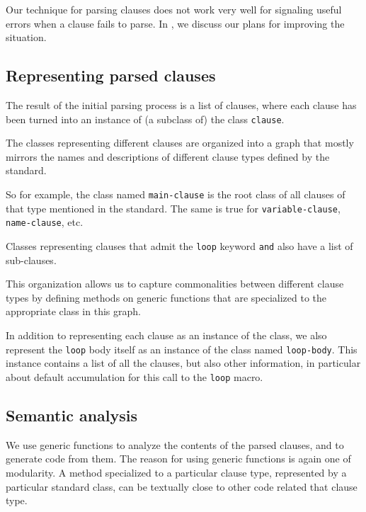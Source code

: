 Our technique for parsing clauses does not work very well for
signaling useful errors when a clause fails to parse.  In
, we discuss our plans for improving
the situation.

\subsection{Representing parsed clauses}
\label{sec-our-technique-representing-parsed-clauses}

The result of the initial parsing process is a list of clauses, where
each clause has been turned into an instance of (a subclass of) the
class \texttt{clause}.

The classes representing different clauses are organized into a graph
that mostly mirrors the names and descriptions of different
clause types defined by the \commonlisp{} standard.

So for example, the class named \texttt{main-clause} is
the root class of all clauses of that type mentioned in the standard.
The same is true for \texttt{variable-clause}, \texttt{name-clause},
etc. 

Classes representing clauses that admit the \texttt{loop} keyword
\texttt{and} also have a list of sub-clauses.

This organization allows us to capture commonalities between different
clause types by defining methods on generic functions that are
specialized to the appropriate class in this graph.

In addition to representing each clause as an instance of the
 class, we also represent the \texttt{loop} body itself
as an instance of the class named \texttt{loop-body}.  This instance
contains a list of all the clauses, but also other information, in
particular about default accumulation for this call to the
\texttt{loop} macro.

\subsection{Semantic analysis}
\label{sec-our-technique-semantic-analysis}

We use generic functions to analyze the contents of the parsed
clauses, and to generate code from them.  The reason for using generic
functions is again one of modularity.  A method specialized to a
particular clause type, represented by a particular standard class,
can be textually close to other code related that clause type.


